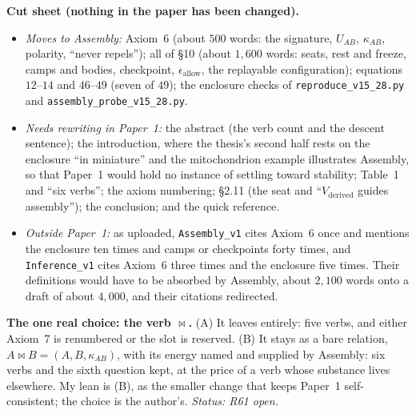 \documentclass[11pt]{article}
\begin{document}
\textbf{Cut sheet (nothing in the paper has been changed).}
\begin{itemize}
\item \emph{Moves to Assembly:} Axiom~6 (about $500$ words: the signature, $U_{AB}$,
$\kappa_{AB}$, polarity, ``never repels''); all of \S10 (about $1{,}600$ words:
seats, rest and freeze, camps and bodies, checkpoint, $\epsilon_{\text{allow}}$,
the replayable configuration); equations $12$--$14$ and $46$--$49$ (seven of
$49$); the enclosure checks of \texttt{reproduce\_v15\_28.py} and
\texttt{assembly\_probe\_v15\_28.py}.
\item \emph{Needs rewriting in Paper~1:} the abstract (the verb count and the
descent sentence); the introduction, where the thesis's second half rests on the
enclosure ``in miniature'' and the mitochondrion example illustrates Assembly,
so that Paper~1 would hold no instance of settling toward stability; Table~1 and
``six verbs''; the axiom numbering; \S2.11 (the seat and ``$V_{\text{derived}}$
guides assembly''); the conclusion; and the quick reference.
\item \emph{Outside Paper~1:} as uploaded, \texttt{Assembly\_v1} cites Axiom~6
once and mentions the enclosure ten times and camps or checkpoints forty times,
and \texttt{Inference\_v1} cites Axiom~6 three times and the enclosure five
times. Their definitions would have to be absorbed by Assembly, about $2{,}100$
words onto a draft of about $4{,}000$, and their citations redirected.
\end{itemize}

\textbf{The one real choice: the verb $\bowtie$.} (A) It leaves entirely:
five verbs, and either Axiom~7 is renumbered or the slot is reserved. (B) It
stays as a bare relation, $A\bowtie B=(A,B,\kappa_{AB})$, with its energy named
and supplied by Assembly: six verbs and the sixth question kept, at the price of
a verb whose substance lives elsewhere. My lean is (B), as the smaller change
that keeps Paper~1 self-consistent; the choice is the author's.
\emph{Status: R61 open.}
\end{document}
